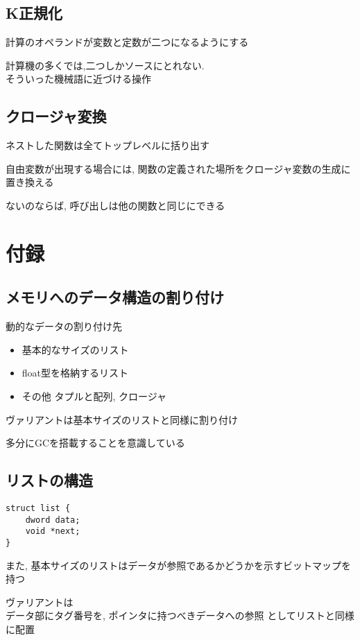\documentclass[papersize,30pt,slide]{jsarticle}
\begin{document}
\newpage
\subsection{K正規化}
計算のオペランドが変数と定数が二つになるようにする

計算機の多くでは,二つしかソースにとれない. \\
そういった機械語に近づける操作

\subsection{クロージャ変換}
ネストした関数は全てトップレベルに括り出す

自由変数が出現する場合には, 関数の定義された場所をクロージャ変数の生成に置き換える

ないのならば, 呼び出しは他の関数と同じにできる

\newpage

\section{付録}
\subsection{メモリへのデータ構造の割り付け}
動的なデータの割り付け先
\begin{itemize}
\item 基本的なサイズのリスト
\item float型を格納するリスト
\item その他 タプルと配列, クロージャ
\end{itemize}
ヴァリアントは基本サイズのリストと同様に割り付け

多分にGCを搭載することを意識している

\newpage
\subsection{リストの構造}
\begin{verbatim}
struct list {
    dword data;
    void *next;
}
\end{verbatim}
また, 基本サイズのリストはデータが参照であるかどうかを示すビットマップを持つ

\vspace{1em}

ヴァリアントは \\
データ部にタグ番号を, ポインタに持つべきデータへの参照
としてリストと同様に配置
\end{document}
